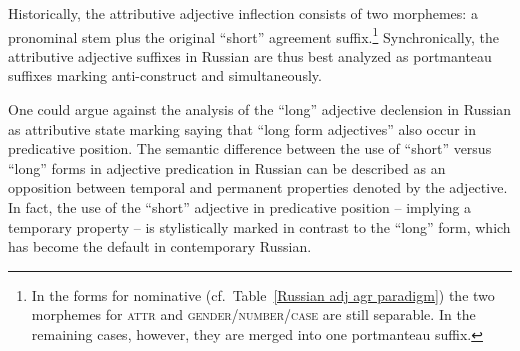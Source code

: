 Historically, the attributive adjective inflection consists of two morphemes: a pronominal stem plus the original “short” agreement suffix.\footnote{In the forms for nominative (cf.~Table~\ref{Russian adj agr paradigm}) the two morphemes for \textsc{attr} and \textsc{gender/number/case} are still separable. In the remaining cases, however, they are merged into one portmanteau suffix.} Synchronically, the attributive adjective suffixes in Russian are thus best analyzed as portmanteau suffixes marking anti\hyp{}construct and  simultaneously.

One could argue against the analysis of the “long” adjective declension in Russian as attributive state marking saying that “long form adjectives” also occur in predicative position. The semantic difference between the use of “short” versus “long” forms in adjective predication in Russian can be described as an opposition between temporal and permanent properties denoted by the adjective. In fact, the use of the “short” adjective in predicative position – implying a temporary property – is stylistically marked in contrast to the “long” form, which has become the default in contemporary Russian.  

